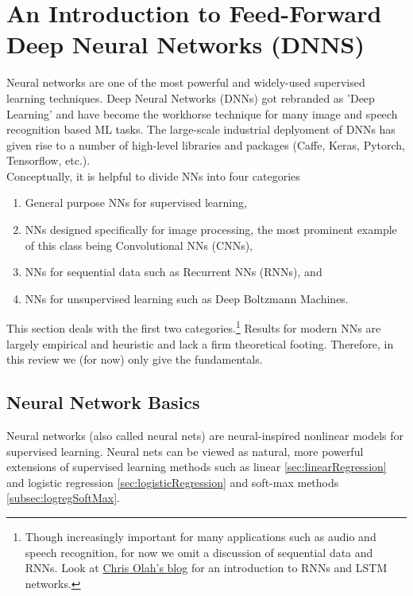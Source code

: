 \section{An Introduction to Feed-Forward Deep Neural Networks (DNNS)}
\label{sec:dnn}
 Neural networks are one of the most powerful and widely-used supervised learning techniques. Deep Neural Networks (DNNs) got rebranded as ’Deep Learning’ and have become the workhorse technique for many image and speech recognition based ML tasks. The large-scale industrial deplyoment of DNNs has given rise to a number of high-level libraries and packages (Caffe, Keras, Pytorch, Tensorflow, etc.).\\
 Conceptually, it is helpful to divide NNs into four categories 
 \begin{enumerate}
 	\item General purpose NNs for supervised learning,
 	\item NNs designed specifically for image processing, the most prominent example of this class being Convolutional NNs (CNNs), 
 	\item NNs for sequential data such as Recurrent NNs (RNNs), and
 	\item NNs for unsupervised learning such as Deep Boltzmann Machines.
 \end{enumerate}
This section deals with the first two categories.\footnote{Though increasingly important for many applications such as audio and speech recognition, for now we omit a discussion of sequential data and RNNs. Look at \href{https://colah.github.io/posts/2015-08-Understanding-LSTMs/}{Chris Olah's blog} for an introduction to RNNs and LSTM networks.}
Results for modern NNs are largely empirical and heuristic and lack a firm theoretical footing. Therefore, in this review we (for now) only give the fundamentals.

\subsection{Neural Network Basics}
Neural networks (also called neural nets) are neural-inspired nonlinear models for supervised learning. Neural nets can be viewed as natural, more powerful extensions of supervised learning methods such as linear \ref{sec:linearRegression} and logistic regression \ref{sec:logisticRegression} and soft-max methods \ref{subsec:logregSoftMax}.
